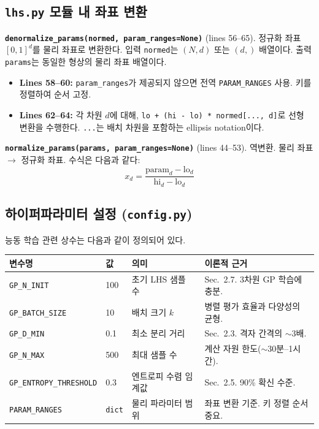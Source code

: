 \documentclass[11pt]{article}
\begin{document}
\subsection{\texttt{lhs.py} 모듈 내 좌표 변환}

\textbf{\texttt{denormalize\_params(normed, param\_ranges=None)}} (lines 56--65). 정규화 좌표 $[0,1]^d$를 물리 좌표로 변환한다. 입력 \texttt{normed}는 $(N, d)$ 또는 $(d,)$ 배열이다. 출력 \texttt{params}는 동일한 형상의 물리 좌표 배열이다.

\begin{itemize}
  \item \textbf{Lines 58--60:} \texttt{param\_ranges}가 제공되지 않으면 전역 \texttt{PARAM\_RANGES} 사용. 키를 정렬하여 순서 고정.
  \item \textbf{Lines 62--64:} 각 차원 $d$에 대해, \texttt{lo + (hi - lo) * normed[..., d]}로 선형 변환을 수행한다. \texttt{...}는 배치 차원을 포함하는 ellipsis notation이다.
\end{itemize}

\textbf{\texttt{normalize\_params(params, param\_ranges=None)}} (lines 44--53). 역변환. 물리 좌표 $\to$ 정규화 좌표. 수식은 다음과 같다:
\begin{equation}\label{eq:normalize}
x_d = \frac{\text{param}_d - \text{lo}_d}{\text{hi}_d - \text{lo}_d}
\end{equation}


\subsection{하이퍼파라미터 설정 (\texttt{config.py})}

능동 학습 관련 상수는 다음과 같이 정의되어 있다.

\begin{table}[htbp]
\centering
\small
\begin{tabular}{@{}llll@{}}
\toprule
변수명 & 값 & 의미 & 이론적 근거 \\
\midrule
\texttt{GP\_N\_INIT} & 100 & 초기 LHS 샘플 수 & Sec.~2.7. 3차원 GP 학습에 충분. \\
\texttt{GP\_BATCH\_SIZE} & 10 & 배치 크기 $k$ & 병렬 평가 효율과 다양성의 균형. \\
\texttt{GP\_D\_MIN} & 0.1 & 최소 분리 거리 & Sec.~2.3. 격자 간격의 ${\sim}3$배. \\
\texttt{GP\_N\_MAX} & 500 & 최대 샘플 수 & 계산 자원 한도(${\sim}$30분--1시간). \\
\texttt{GP\_ENTROPY\_THRESHOLD} & 0.3 & 엔트로피 수렴 임계값 & Sec.~2.5. 90\% 확신 수준. \\
\texttt{PARAM\_RANGES} & \texttt{dict} & 물리 파라미터 범위 & 좌표 변환 기준. 키 정렬 순서 중요. \\
\bottomrule
\end{tabular}
\end{table}
\end{document}
